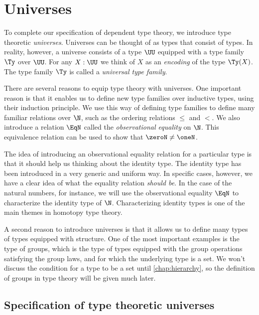 \section{Universes}\label{sec:universes}

To complete our specification of dependent type theory, we introduce type theoretic \emph{universes}. Universes can be thought of as types that consist of types. In reality, however, a universe consists of a type $\UU$ equipped with a type family $\Ty$ over $\UU$. For any $X:\UU$ we think of $X$ as an \emph{encoding} of the type $\Ty(X)$. The type family $\Ty$ is called a \emph{universal type family}.

There are several reasons to equip type theory with universes. One important reason is that it enables us to define new type families over inductive types, using their induction principle. We use this way of defining type families to define many familiar relations over $\N$, such as the ordering relations $\leq$ and $<$. We also introduce a relation $\EqN$ called the \emph{observational equality} on $\N$. This equivalence relation can be used to show that $\zeroN\neq\oneN$.

The idea of introducing an observational equality relation for a particular type is that it should help us thinking about the identity type. The identity type has been introduced in a very generic and uniform way. In specific cases, however, we have a clear idea of what the equality relation \emph{should be}. In the case of the natural numbers, for instance, we will use the observational equality $\EqN$ to characterize the identity type of $\N$. Characterizing identity types is one of the main themes in homotopy type theory.

A second reason to introduce universes is that it allows us to define many types of types equipped with structure. One of the most important examples is the type of groups, which is the type of types equipped with the group operations satisfying the group laws, and for which the underlying type is a set. We won't discuss the condition for a type to be a set until \cref{chap:hierarchy}, so the definition of groups in type theory will be given much later.

\subsection{Specification of type theoretic universes}

